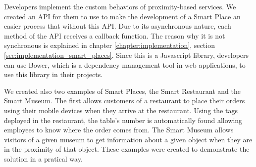Developers implement the custom behaviors of proximity-based services.
We created an \gls{API} for them to use to make the development of a Smart Place an easier process that without this \gls{API}.
Due to its asynchronous nature, each method of the \gls{API} receives a callback function.
The reason why it is not synchronous is explained in chapter \ref{chapter:implementation}, section \ref{sec:implementation_smart_places}.
Since this is a Javascript library, developers can use Bower, which is a dependency management tool in web applications, to use this library in their projects.

We created also two examples of Smart Places, the Smart Restaurant and the Smart Museum.
The first allows customers of a restaurant to place their orders using their mobile devices when they arrive at the restaurant. Using the tags deployed in the restaurant, the table's number is automatically found allowing employees to know where the order comes from.
The Smart Museum allows visitors of a given museum to get information about a given object when they are in the proximity of that object.
These examples were created to demonstrate the solution in a pratical way.
